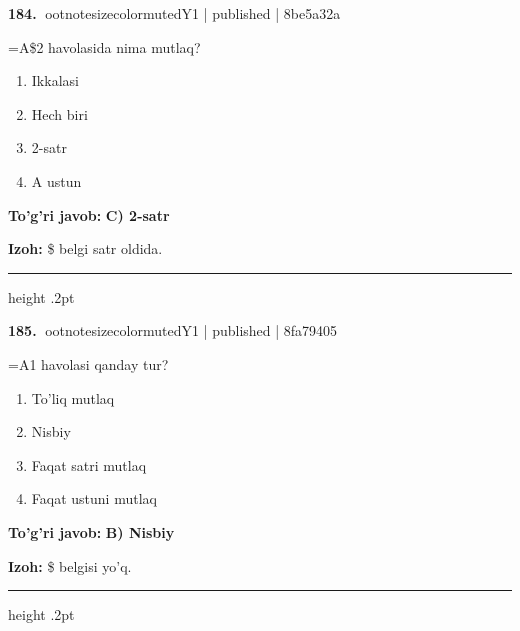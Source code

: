 \documentclass[10pt,a4paper]{article}
\begin{document}
\textbf{\color{ink}184.} {ootnotesizecolor{muted}Y1 | published | 8be5a32a}
\par
=A\$2 havolasida nima mutlaq?
\begin{enumerate}[label=\Alph*),leftmargin=9mm]
\item Ikkalasi
\item Hech biri
\item 2-satr
\item A ustun
\end{enumerate}
\begin{tcolorbox}[enhanced,breakable,colback=teal!4,colframe=teal!55!black,boxrule=0.45pt,arc=1.2mm,left=2.8mm,right=2.8mm,top=2mm,bottom=2mm]
\textbf{\color{teal}To'g'ri javob:} \textbf{C) 2-satr}
\par\smallskip
\textbf{Izoh:} \$ belgi satr oldida.
\end{tcolorbox}
\vspace{2mm}\hrule height .2pt\vspace{2mm}

\textbf{\color{ink}185.} {ootnotesizecolor{muted}Y1 | published | 8fa79405}
\par
=A1 havolasi qanday tur?
\begin{enumerate}[label=\Alph*),leftmargin=9mm]
\item To'liq mutlaq
\item Nisbiy
\item Faqat satri mutlaq
\item Faqat ustuni mutlaq
\end{enumerate}
\begin{tcolorbox}[enhanced,breakable,colback=teal!4,colframe=teal!55!black,boxrule=0.45pt,arc=1.2mm,left=2.8mm,right=2.8mm,top=2mm,bottom=2mm]
\textbf{\color{teal}To'g'ri javob:} \textbf{B) Nisbiy}
\par\smallskip
\textbf{Izoh:} \$ belgisi yo'q.
\end{tcolorbox}
\vspace{2mm}\hrule height .2pt\vspace{2mm}
\end{document}

